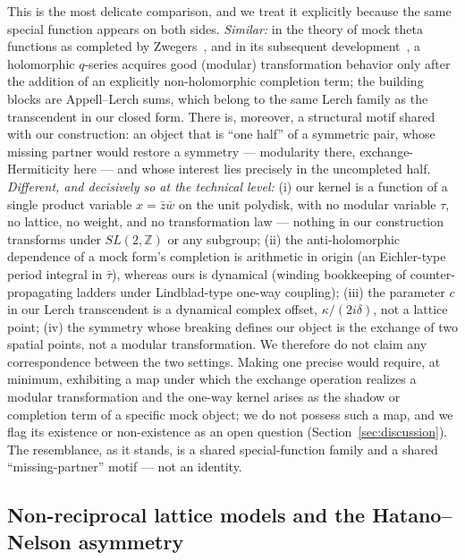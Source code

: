\documentclass[11pt,a4paper]{article}
\newcommand{\zb}{\bar{z}}
\newcommand{\wb}{\bar{w}}
\begin{document}
This is the most delicate comparison, and we treat it explicitly because the
same special function appears on both sides. \emph{Similar:} in the theory of
mock theta functions as completed by Zwegers~\cite{Zwegers2002}, and in its
subsequent development~\cite{Zagier2009,DMZ2012}, a holomorphic $q$-series
acquires good (modular) transformation behavior only after the addition of an
explicitly non-holomorphic completion term; the building blocks are
Appell--Lerch sums, which belong to the same Lerch family as the transcendent
in our closed form. There is, moreover, a structural motif shared with our
construction: an object that is ``one half'' of a symmetric pair, whose missing
partner would restore a symmetry --- modularity there, exchange-Hermiticity
here --- and whose interest lies precisely in the uncompleted half.
\emph{Different, and decisively so at the technical level:} (i) our kernel is a
function of a single product variable $x = \zb\wb$ on the unit polydisk, with
no modular variable $\tau$, no lattice, no weight, and no transformation law
--- nothing in our construction transforms under $SL(2,\mathbb{Z})$ or any
subgroup; (ii) the anti-holomorphic dependence of a mock form's completion is
arithmetic in origin (an Eichler-type period integral in $\bar{\tau}$), whereas
ours is dynamical (winding bookkeeping of counter-propagating ladders under
Lindblad-type one-way coupling); (iii) the parameter $c$ in our Lerch
transcendent is a dynamical complex offset, $\kappa/(2 i \delta)$, not a
lattice point; (iv) the symmetry whose breaking defines our object is the
exchange of two spatial points, not a modular transformation. We therefore do
not claim any correspondence between the two settings. Making one precise would
require, at minimum, exhibiting a map under which the exchange operation
realizes a modular transformation and the one-way kernel arises as the shadow
or completion term of a specific mock object; we do not possess such a map, and
we flag its existence or non-existence as an open question
(Section~\ref{sec:discussion}). The resemblance, as it stands, is a shared
special-function family and a shared ``missing-partner'' motif --- not an
identity.

\subsection{Non-reciprocal lattice models and the Hatano--Nelson asymmetry}
\label{sec:hn}
\end{document}
